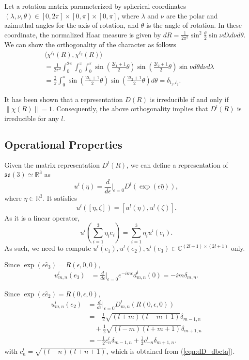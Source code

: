 \documentclass[onecolumn,11pt]{IEEEtran}
\newcommand{\pair}[1]{\ensuremath{\langle #1 \rangle}}
\newcommand{\refeqn}[1]{(\ref{eqn:#1})}
\newcommand{\so}{\ensuremath{\mathfrak{so}(3)}}
\renewcommand{\Re}{\ensuremath{\mathbb{R}}}
\newcommand{\Cp}{\ensuremath{\mathbb{C}}}
\begin{document}
Let a rotation matrix parameterized by spherical coordinates $(\lambda,\nu,\theta)\in[0,2\pi]\times[0,\pi]\times[0,\pi]$, where $\lambda$ and $\nu$ are the polar and azimuthal angles for the axis of rotation, and $\theta$ is the angle of rotation. 
In these coordinate, the normalized Haar measure is given by $dR=\frac{1}{2\pi^2} \sin^2\frac{\theta}{2} \sin\nu d\lambda d\nu d\theta$. 
We can show the orthogonality of the character as follows
\begin{align*}
&\pair{\chi^{l_1}(R), \chi^{l_2}(R)}
\\
&=\frac{1}{2\pi^2} \int_{0}^{2\pi} \int_{0}^\pi \int_0^\pi \sin(\frac{2l_1+1}{2}\theta)\sin(\frac{2l_2+1}{2}\theta) \sin\nu   d\theta  d\nu d\lambda\\
&=\frac{2}{\pi} \int_0^\pi \sin(\frac{2l_1+1}{2}\theta)\sin(\frac{2l_2+1}{2}\theta)  d\theta =\delta_{l_1,l_2}.
\end{align*}

It has been shown that a representation $D(R)$ is irreducible if and only if $\|\chi(R)\|=1$. Consequently, the above orthogonality implies that $D^l(R)$ is irreducible for any $l$.


\subsection{Operational Properties}

Given the matrix representation $D^l(R)$, we can define a representation of $\so\simeq \Re^3$ as
\[
u^l(\eta)= \frac{d}{d\epsilon}\bigg|_{\epsilon=0} D^l(\exp(\epsilon\hat\eta)),
\]
where $\eta\in\Re^3$. It satisfies
\[
u^l([\eta,\zeta])=[u^l(\eta),u^l(\zeta)].
\]
As it is a linear operator,
\[
u^l(\sum_{i=1}^3 \eta_i e_i) = \sum_{i=1}^3 \eta_i u^l(e_i).
\]
As such, we need to compute $u^l(e_1),u^l(e_2),u^l(e_3)\in\Cp^{(2l+1)\times(2l+1)}$ only.

Since $\exp(\epsilon\hat e_3) = R(\epsilon,0,0)$,
\begin{align}
u^l_{m,n}(e_3) & = \frac{d}{d\epsilon}\bigg|_{\epsilon=0} e^{-im\epsilon}d^l_{m,n}(0)=-im\delta_{m,n}.
\end{align}

Since $\exp(\epsilon\hat e_2) = R(0,\epsilon,0)$, 
\begin{align}
u^l_{m,n}(e_2) & = \frac{d}{d\epsilon}\bigg|_{\epsilon=0} D^l_{m,n}(R(0,\epsilon,0))\nonumber\\
& = -\frac{1}{2}\sqrt{(l+m)(l-m+1)} \delta_{m-1,n}\nonumber\\
& \quad + \frac{1}{2}\sqrt{(l-m)(l+m+1)} \delta_{m+1,n}\nonumber\\
& = -\frac{1}{2}c^l_n \delta_{m-1,n}+\frac{1}{2}c^l_{-n} \delta_{m+1,n}.
\end{align}
with $c^l_n=\sqrt{(l-n)(l+n+1)}$, which is obtained from \refeqn{dD_dbeta}.
\end{document}

